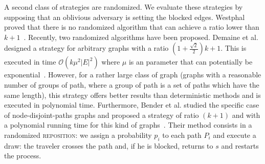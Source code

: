 \documentclass[letter-size, 11pt]{article}
\newcommand{\card}[1]{\left| #1 \right|}
\newcommand{\stpaths}{$(s,t)$-paths}
\newcommand{\mcalp}{\mathcal{P}}
\begin{document}
A second class of strategies are randomized. We evaluate these strategies by supposing that an oblivious adversary is setting the blocked edges. Westphal proved that there is no randomized algorithm that can achieve a ratio lower than $k+1$~\cite{We08}. Recently, two randomized algorithms have been proposed. Demaine et al. designed a strategy for arbitrary graphs with a ratio $\left(1+\frac{\sqrt{2}}{2}\right)k+1$. This is executed in time $\mathcal{O}\left(k\mu^2\card{E}^2\right)$ where $\mu$ is an parameter that can potentially be exponential~\cite{DeHuLiSa14}. However, for a rather large class of graph (graphs with a reasonable number of groups of path, where a group of path is a set of paths which have the same length), this strategy offers better results than deterministic methods and is executed in polynomial time. Furthermore, Bender et al. studied the specific case of node-disjoint-paths graphs and proposed a strategy of ratio $\left(k+1\right)$ and with a polynomial running time for this kind of graphs~\cite{BeWe15}. Their method consists in a randomized \textsc{reposition}: we assign a probability $p_i$ to each path $P_i$ and execute a draw: the traveler crosses the path and, if he is blocked, returns to $s$ and restarts the process.

\end{document}
